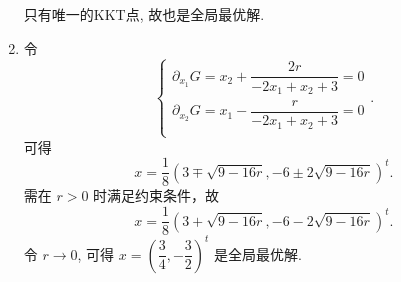 \begin{Problem}
\begin{enumerate}
        只有唯一的KKT点, 故也是全局最优解.
        \item 令 
        \[\begin{cases}
            \partial_{x_1}G = x_2 + \dfrac{2r}{-2x_1 + x_2 + 3} = 0\\
            \partial_{x_2}G = x_1 - \dfrac{r}{-2x_1 + x_2 + 3} = 0\\
        \end{cases}.\] 可得 \[x = \frac{1}{8}(3 \mp \sqrt{9 - 16r}, -6 \pm 2\sqrt{9 - 16r})^t.\] 
        需在 $r > 0$ 时满足约束条件，故 
        \[x = \frac{1}{8}(3 + \sqrt{9 - 16r}, -6 - 2\sqrt{9 - 16r})^t.\] 
        令 $r \to 0$, 可得 $x = \left(\dfrac{3}{4}, -\dfrac{3}{2}\right)^t$ 是全局最优解.
    \end{enumerate}
\end{Problem}

